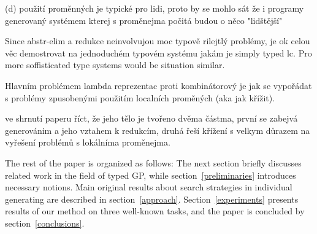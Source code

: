 \documentclass{sig-alternate}
\newcommand{\red}[1]{{\color{red} #1}}
\newcommand{\nehodi}[1]{{\color{yellow} #1}}
\begin{document}
{  (d) použití proměnných je typické pro lidi, proto by se mohlo sát že
      i programy generovaný systémem kterej s proměnejma počitá budou o něco 
      "lidštější"



Since abstr-elim a redukce neinvolvujou moc typově rilejtlý problémy, je ok celou věc demostrovat na jednoduchém typovém systému jakám je simply typed lc. Pro more soffisticated type systems would be situation similar.

Hlavním problémem lambda reprezentac proti kombinátorový je 
jak se vypořádat s problémy zpusobenými použitím 
localních proměných (aka jak křížit).

}


\red{ve shrnutí paperu říct, že jeho tělo je tvořeno dvěma částma,
první se zabejvá generovánim a jeho vztahem k redukcím, druhá řeší křížení
s velkym důrazem na vyřešení problémů s lokálníma proměnejma.}

The rest of the paper is organized as follows: The next section briefly discusses related work in the field of typed GP, while section~\ref{preliminaries} introduces necessary notions. Main original results about search strategies in individual generating are described in section~\ref{approach}. Section~\ref{experiments} presents results of our method on three well-known tasks, and the paper is concluded by section~\ref{conclusions}.
\end{document}
